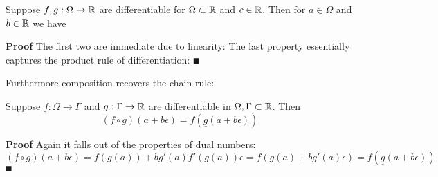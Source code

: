 \begin{lemma} Suppose $f,g : \Omega \rightarrow {\mathbb R}$ are differentiable for $\Omega \subset {\mathbb R}$ and $c \in {\mathbb R}$. Then for $a \ensuremath{\in} \ensuremath{\Omega}$ and $b \in {\mathbb R}$ we have
\end{lemma}
\textbf{Proof} The first two are immediate due to linearity:
The last property essentially captures the product rule of differentiation:
\ensuremath{\QED}

Furthermore composition recovers the chain rule:

\begin{lemma}[composition]  Suppose $f : \ensuremath{\Omega} \ensuremath{\rightarrow} \ensuremath{\Gamma}$ and $g : \Gamma \rightarrow {\mathbb R}$ are differentiable in $\Omega,\Gamma \subset {\mathbb R}$. Then
\[
\underline{(f \ensuremath{\circ} g)}(a+b \ensuremath{\epsilon}) = \underline{f}(\underline{g}(a+b\ensuremath{\epsilon}))
\]
\end{lemma}
\textbf{Proof} Again it falls out of the properties of dual numbers:
\[
\underline{(f \ensuremath{\circ} g)}(a+b \ensuremath{\epsilon}) = f(g(a)) + bg'(a) f'(g(a)) \ensuremath{\epsilon} = \underline{f}(g(a)+bg'(a)\ensuremath{\epsilon}) = \underline{f}(\underline{g}(a+b\ensuremath{\epsilon}))
\]
\ensuremath{\QED}

